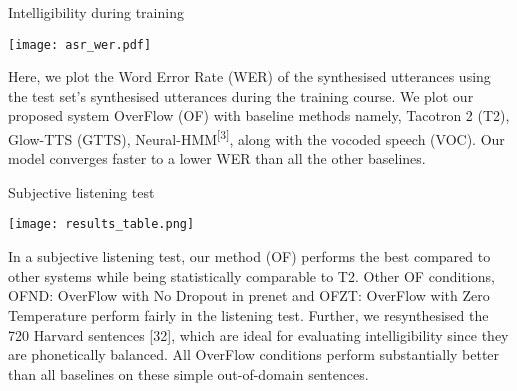 
\begin{tcolorbox}
    \begin{center}
        Intelligibility during training
    \end{center}	

\end{tcolorbox}
\begin{center}
	\texttt{[image: asr\_wer.pdf]}
\end{center}
Here, we plot the Word Error Rate (WER) of the synthesised utterances using the test set's synthesised utterances during the training course. We plot our proposed system OverFlow (OF) with baseline methods namely, Tacotron 2 (T2), Glow-TTS (GTTS), Neural-HMM\textsuperscript{[3]}, along with the vocoded speech (VOC). Our model converges faster to a lower WER than all the other baselines.

\vspace{1.5em}

\begin{tcolorbox}
    \begin{center}
        Subjective listening test
    \end{center}
\end{tcolorbox}

\begin{center}
	\texttt{[image: results\_table.png]}
\end{center}
In a subjective listening test, our method (OF) performs the best compared to other systems while being statistically comparable to T2. Other OF conditions, OFND: OverFlow with No Dropout in prenet and OFZT: OverFlow with Zero Temperature perform fairly in the listening test. Further, we resynthesised the 720 Harvard sentences [32], which are ideal for evaluating intelligibility since they are phonetically balanced. All OverFlow conditions perform substantially better than all baselines on these simple out-of-domain sentences.
\par
\vspace{1.5em}
\par

